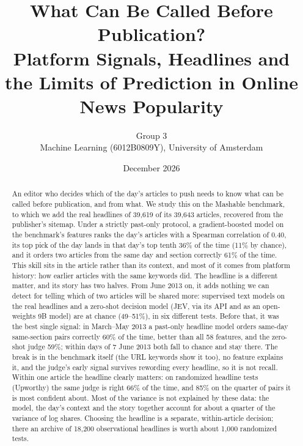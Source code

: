 \documentclass[10pt,a4paper,twocolumn]{article}
\title{What Can Be Called Before Publication?\\
Platform Signals, Headlines and the Limits of Prediction in Online News Popularity}
\author{Group 3 \\ Machine Learning (6012B0809Y), University of Amsterdam}
\date{December 2026}
\begin{document}
\maketitle

\begin{abstract}
An editor who decides which of the day's articles to push needs to know what can be called before publication,
and from what. We study this on the Mashable benchmark, to which we add the real headlines of 39{,}619 of its
39{,}643 articles, recovered from the publisher's sitemap. Under a strictly past-only protocol, a gradient-boosted
model on the benchmark's features ranks the day's articles with a Spearman correlation of 0.40, its top pick
of the day lands in that day's top tenth 36\% of the time (11\% by chance), and it orders two articles from the
same day and section correctly 61\% of the time. This skill sits in the article rather than its context, and
most of it comes from platform history: how earlier articles with the same keywords did. The headline is a different matter, and its story has two halves. From June 2013 on, it adds nothing we can
detect for telling which of two articles will be shared more: supervised text models on the real headlines and a
zero-shot decision model (JEV, via its API and as an open-weights 9B model) are at chance (49--51\%), in six
different tests. Before that, it was the best single signal: in March--May 2013 a past-only headline model orders
same-day same-section pairs correctly 60\% of the time, better than all 58 features, and the zero-shot judge 59\%;
within days of 7 June 2013 both fall to chance and stay there. The break is in the benchmark itself (the URL keywords
show it too), no feature explains it, and the judge's early signal survives rewording every headline, so it is not
recall. Within one article the headline clearly matters: on randomized headline tests (Upworthy) the same judge is
right 66\% of the time, and 85\% on the quarter of pairs it is most confident about. Most of the variance is not explained by these data:
the model, the day's context and the story together account for about a quarter of the variance of log shares. Choosing the headline is a separate, within-article decision; there an archive of 18{,}200
observational headlines is worth about 1{,}000 randomized tests.
\end{abstract}

\end{document}
